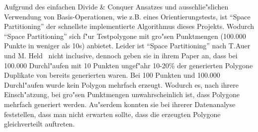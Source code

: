     Aufgrund des einfachen Divide \& Conquer Ansatzes und ausschlie"slichen
    Verwendung von Basis-Operationen, wie z.B. eines Orientierungstests, ist
    ``Space Partitioning'' der schnellste implementierte Algorithmus dieses
    Projekts. Wodurch ``Space Partitioning'' sich f"ur Testpolygone mit gro"sen
    Punktmengen (100.000 Punkte in weniger als 10s) anbietet. Leider ist ``Space
    Partitioning'' nach T.Auer und M. Held~\cite{held98polygons} nicht
    inclusive,  dennoch geben sie in ihrem Paper an, dass bei 100.000
    Durchl"aufen mit 10 Punkten ungef"ahr 10-20\% der generierten Polygone
    Duplikate von bereits generierten waren. Bei 100 Punkten und 100.000
    Durchl"aufen wurde kein Polygon mehrfach erzeugt. Wodurch es, nach ihrere
    Einsch"atzung, bei gro"sen Punktmengen unwahrscheinlich ist, dass Polygone
    mehrfach generiert werden. Au"serdem konnten sie bei ihrerer Datenanalyse
    feststellen, dass man nicht erwarten sollte, dass die erzeugten Polygone
    gleichverteilt auftreten.

